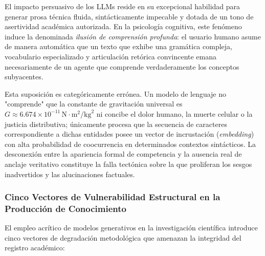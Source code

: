 El impacto persuasivo de los LLMs reside en su excepcional habilidad para generar prosa técnica fluida, sintácticamente impecable y dotada de un tono de asertividad académica autorizada. En la psicología cognitiva, este fenómeno induce la denominada \textit{ilusión de comprensión profunda}: el usuario humano asume de manera automática que un texto que exhibe una gramática compleja, vocabulario especializado y articulación retórica convincente emana necesariamente de un agente que comprende verdaderamente los conceptos subyacentes.

Esta suposición es categóricamente errónea. Un modelo de lenguaje no "comprende" que la constante de gravitación universal es $G \approx 6.674 \times 10^{-11} \, \text{N}\cdot\text{m}^2/\text{kg}^2$ ni concibe el dolor humano, la muerte celular o la justicia distributiva; únicamente procesa que la secuencia de caracteres correspondiente a dichas entidades posee un vector de incrustación (\textit{embedding}) con alta probabilidad de coocurrencia en determinados contextos sintácticos. La desconexión entre la apariencia formal de competencia y la ausencia real de anclaje veritativo constituye la falla tectónica sobre la que proliferan los sesgos inadvertidos y las alucinaciones factuales.

\subsubsection{Cinco Vectores de Vulnerabilidad Estructural en la Producción de Conocimiento}

El empleo acrítico de modelos generativos en la investigación científica introduce cinco vectores de degradación metodológica que amenazan la integridad del registro académico:


